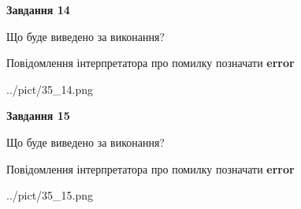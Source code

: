 \documentclass[11pt, ukrainian]{article}
\begin{document}
{\begin {large}
{\begin {center}\textbf{Завдання 14}\end {center}}\par
Що буде виведено за виконання? \par
Повідомлення інтерпретатора про помилку позначати \textbf{error}

\begin{center}
	{../pict/35_14.png}
\end{center}
\newpage

{\begin {center}\textbf{Завдання 15}\end {center}}\par
Що буде виведено за виконання? \par
Повідомлення інтерпретатора про помилку позначати \textbf{error}

\begin{center}
	{../pict/35_15.png}
\end{center}
\newpage

\end {large}}
\end{document}
